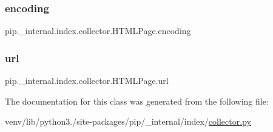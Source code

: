 \subsubsection{\texorpdfstring{encoding}{encoding}}
{\footnotesize\ttfamily pip.\+\_\+internal.\+index.\+collector.\+H\+T\+M\+L\+Page.\+encoding\hspace{0.3cm}{\ttfamily [static]}}

\mbox{\label{classpip_1_1__internal_1_1index_1_1collector_1_1HTMLPage_ac9fa1d50eb8ccef27d82a4ed1a92c1a8}} 
\subsubsection{\texorpdfstring{url}{url}}
{\footnotesize\ttfamily pip.\+\_\+internal.\+index.\+collector.\+H\+T\+M\+L\+Page.\+url\hspace{0.3cm}{\ttfamily [static]}}



The documentation for this class was generated from the following file\+:\begin{DoxyCompactItemize}
\item 
venv/lib/python3./site-\/packages/pip/\+\_\+internal/index/\hyperlink{collector_8py}{collector.\+py}\end{DoxyCompactItemize}

